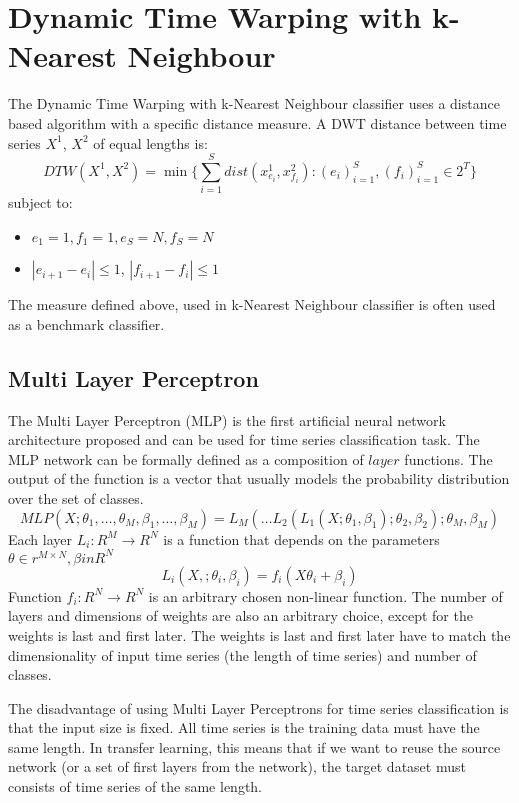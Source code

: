 \documentclass[a4paper,11pt,twoside]{report}
\theoremstyle{definition}
\begin{document}
\section{Dynamic Time Warping with k-Nearest Neighbour}
The Dynamic Time Warping with k-Nearest Neighbour classifier uses a distance based algorithm with a specific distance measure. A DWT distance between time series $X^1$, $X^2$ of equal lengths is:
$$DTW(X^1, X^2) = \min\{ \sum_{i=1}^S dist(x^1_{e_i}, x^2_{f_i}):(e_i)_{i=1}^S, (f_i)_{i=1}^S\in 2^T\}$$
subject to:
\begin{itemize}
\item $e_1 = 1, f_1 = 1, e_S= N, f_S = N$
\item $|e_{i+1} - e_i | \leq 1$, $|f_{i+1} - f_i | \leq 1$
\end{itemize}
The measure defined above, used in k-Nearest Neighbour classifier is often used as a benchmark classifier. 
\subsection{Multi Layer Perceptron}
The Multi Layer Perceptron (MLP) is the first artificial neural network architecture proposed and can be used for time series classification task. 
The MLP network can be formally defined as a composition of $layer$ functions. The output of the function is a vector that usually models the probability distribution over the set of classes.
$$MLP(X; \theta_1,\dots , \theta_M, \beta_1,\dots , \beta_M) = L_M(\dots L_2(L_1(X;\theta_1, \beta_1);\theta_2, \beta_2);\theta_M, \beta_M)$$
Each layer $L_i: R^M \rightarrow R^N$ is a function that depends on the parameters $\theta \in r^{M\times N}, \beta in R^N$
$$L_i(X, ; \theta_i, \beta_i) = f_i(X \theta_i  + \beta_i)$$
Function $f_i: R^N \rightarrow R^N$ is an arbitrary chosen non-linear function. The number of layers and dimensions of weights are also an arbitrary choice, except for the weights is last and first later. The weights is last and first later have to match the dimensionality of input time series (the length of time series) and number of classes. 

The disadvantage of using Multi Layer Perceptrons for time series classification is that the input size is fixed. All time series is the training data must have the same length. In transfer learning, this means that if we want to reuse the source network (or a set of first layers from the network), the target dataset must consists of time series of the same length. 
\end{document}

